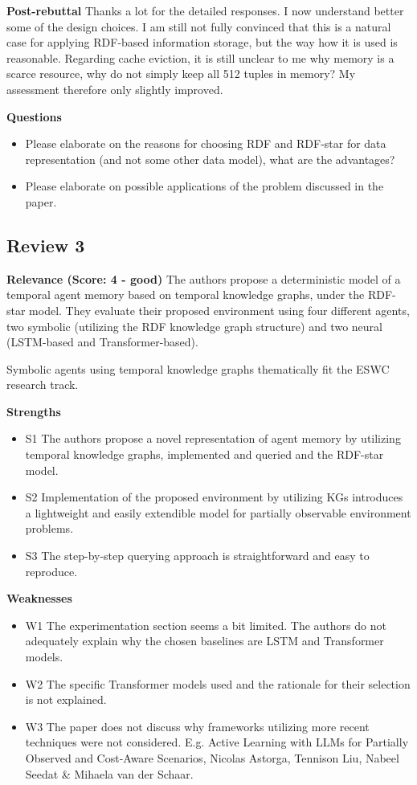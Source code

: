 \documentclass[runningheads]{llncs}
\begin{document}
\textbf{Post-rebuttal} \quad Thanks a lot for the detailed responses. I now understand better some of the design choices. I am still not fully convinced that this is a natural case for applying RDF-based information storage, but the way how it is used is reasonable. Regarding cache eviction, it is still unclear to me why memory is a scarce resource, why do not simply keep all 512 tuples in memory? My assessment therefore only slightly improved.

\textbf{Questions}
\begin{itemize}
  \item Please elaborate on the reasons for choosing RDF and RDF-star for data representation (and not some other data model), what are the advantages?
  \item Please elaborate on possible applications of the problem discussed in the paper.
\end{itemize}

\subsection*{Review 3}
\textbf{Relevance (Score: 4 - good)} \quad The authors propose a deterministic model of a temporal agent memory based on temporal knowledge graphs, under the RDF-star model. They evaluate their proposed environment using four different agents, two symbolic (utilizing the RDF knowledge graph structure) and two neural (LSTM-based and Transformer-based).

Symbolic agents using temporal knowledge graphs thematically fit the ESWC research track.

\textbf{Strengths}
\begin{itemize}
  \item S1 The authors propose a novel representation of agent memory by utilizing temporal knowledge graphs, implemented and queried and the RDF-star model.
  \item S2 Implementation of the proposed environment by utilizing KGs introduces a lightweight and easily extendible model for partially observable environment problems.
  \item S3 The step-by-step querying approach is straightforward and easy to reproduce.
\end{itemize}

\textbf{Weaknesses}
\begin{itemize}
  \item W1 The experimentation section seems a bit limited. The authors do not adequately explain why the chosen baselines are LSTM and Transformer models.
  \item W2 The specific Transformer models used and the rationale for their selection is not explained.
  \item W3 The paper does not discuss why frameworks utilizing more recent techniques were not considered. E.g. Active Learning with LLMs for Partially Observed and Cost-Aware Scenarios, Nicolas Astorga, Tennison Liu, Nabeel Seedat \& Mihaela van der Schaar.
\end{itemize}
\end{document}
